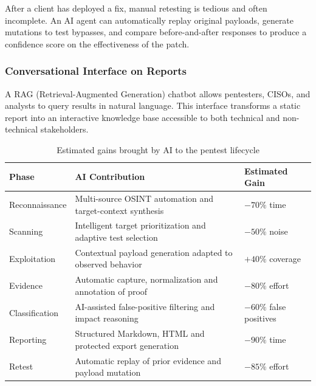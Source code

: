 \documentclass[12pt,a4paper]{report}
\begin{document}
After a client has deployed a fix, manual retesting is tedious and often incomplete.
An AI agent can automatically replay original payloads, generate mutations to test
bypasses, and compare before-and-after responses to produce a confidence score on
the effectiveness of the patch.

\subsubsection{Conversational Interface on Reports}

A RAG (Retrieval-Augmented Generation) chatbot allows pentesters, CISOs, and
analysts to query results in natural language. This interface transforms a static
report into an interactive knowledge base accessible to both technical and
non-technical stakeholders.

\begin{table}[H]
    \centering
    \caption{Estimated gains brought by AI to the pentest lifecycle}
    \label{tab:ai_gains}
    \renewcommand{\arraystretch}{1.35}
    \begin{tabular}{|p{}|p{}|p{}|}
        \hline
        \textbf{Phase} & \textbf{AI Contribution} & \textbf{Estimated Gain} \\
        \hline
        Reconnaissance & Multi-source OSINT automation and target-context synthesis & $-70\%$ time \\
        \hline
        Scanning & Intelligent target prioritization and adaptive test selection & $-50\%$ noise \\
        \hline
        Exploitation & Contextual payload generation adapted to observed behavior & $+40\%$ coverage \\
        \hline
        Evidence & Automatic capture, normalization and annotation of proof & $-80\%$ effort \\
        \hline
        Classification & AI-assisted false-positive filtering and impact reasoning & $-60\%$ false positives \\
        \hline
        Reporting & Structured Markdown, HTML and protected export generation & $-90\%$ time \\
        \hline
        Retest & Automatic replay of prior evidence and payload mutation & $-85\%$ effort \\
        \hline
    \end{tabular}
\end{table}

\end{document}
